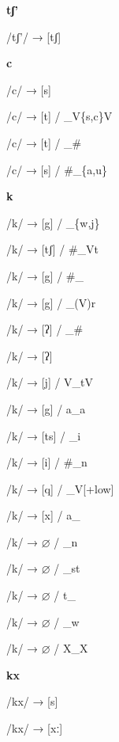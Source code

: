 \begin{center}\textbf{tʃ'}\end{center}
\begin{multicols}{4}
\noindent /tʃ'/ → [tʃ]

\end{multicols}

\begin{center}\textbf{c}\end{center}
\begin{multicols}{4}
\noindent /c/ → [s]

\noindent /c/ → [t] / \_V\{s,c\}V

\noindent /c/ → [t] / \_\#

\noindent /c/ → [s] / \#\_\{a,u\}
\end{multicols}

\begin{center}\textbf{k}\end{center}
\begin{multicols}{4}
\noindent /k/ → [g] / \_\{w,j\}

\noindent /k/ → [tʃ] / \#\_Vt

\noindent /k/ → [g] / \#\_

\noindent /k/ → [g] / \_(V)r

\noindent /k/ → [ʔ] / \_\#

\noindent /k/ → [ʔ]

\noindent /k/ → [j] / V\_tV

\noindent /k/ → [g] / a\_a

\noindent /k/ → [ts] / \_i

\noindent /k/ → [i] / \#\_n

\noindent /k/ → [q] / \_V[+low]

\noindent /k/ → [x] / a\_

\noindent /k/ → $\varnothing$ / \_n

\noindent /k/ → $\varnothing$ / \_st

\noindent /k/ → $\varnothing$ / t\_

\noindent /k/ → $\varnothing$ / \_w

\noindent /k/ → $\varnothing$ / X\_X
\end{multicols}

\begin{center}\textbf{kx}\end{center}
\begin{multicols}{4}
\noindent /kx/ → [s]

\noindent /kx/ → [xː]

\end{multicols}

